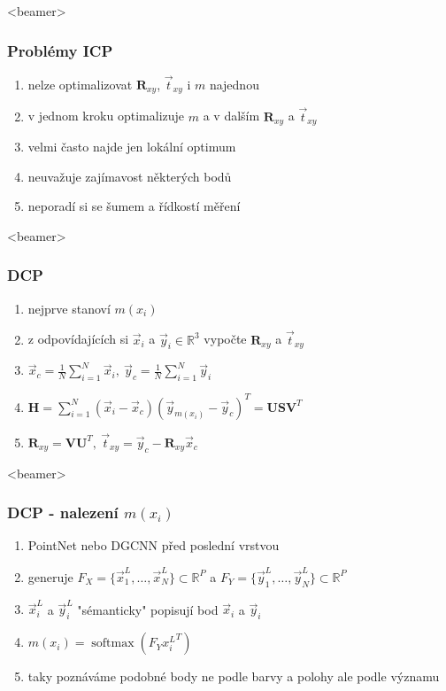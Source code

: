 \documentclass[t]{beamer}
\DeclareMathOperator*{\softmax}{softmax}
\begin{document}
\begin{frame}<beamer>
  \frametitle{Problémy ICP}
  \begin{enumerate}
   \item nelze optimalizovat  $\textbf{R}_{xy}$, $\vec{t}_{xy}$ i $m$ najednou
   \item v jednom kroku optimalizuje $m$ a v dalším  $\textbf{R}_{xy}$ a $\vec{t}_{xy}$
   \item velmi často najde jen lokální optimum
   \item neuvažuje zajímavost některých bodů 
   \item neporadí si se šumem a řídkostí měření 
  \end{enumerate}  
\end{frame}



\begin{frame}<beamer>
  \frametitle{DCP}
  \begin{enumerate}
   \item nejprve stanoví $m(x_i)$ 
   \item z odpovídajících si $\vec x_i$ a $\vec y_i \in \mathbb{R}^3$ vypočte $\textbf{R}_{xy}$ a $\vec{t}_{xy}$
   \item $\displaystyle \vec x_c = \frac{1}{N}\sum_{i=1}^N\vec x_i,~\vec y_c = \frac{1}{N}\sum_{i=1}^N\vec y_i$
   \item $\displaystyle \textbf{H} = \sum_{i=1}^N (\vec x_i-\vec x_c)(\vec y_{m(x_i)}-\vec y_c)^T = \textbf{USV}^T$
   \item $\displaystyle \textbf{R}_{xy}=\textbf{VU}^T, ~ \vec{t}_{xy}=\vec y_c - \textbf{R}_{xy}\vec x_c$
  \end{enumerate}  
\end{frame}


\begin{frame}<beamer>
  \frametitle{DCP - nalezení $m(x_i)$}
  \begin{enumerate}
   \item PointNet nebo DGCNN před poslední vrstvou 
   \item generuje $\textit{F}_X=\lbrace \vec x_1^L, \ldots, \vec x_N^L  \rbrace \subset \mathbb{R}^P $ a $\textit{F}_Y=\lbrace \vec y_1^L, \ldots, \vec y_N^L  \rbrace \subset \mathbb{R}^P$
   \item $\vec x_i^L$ a $\vec y_i^L$ "sémanticky" popisují bod $\vec x_i$ a $\vec y_i$
   \item $\displaystyle m(x_i)=\softmax(\textit{F}_Y {x_i^L}^T)$
   \item taky poznáváme podobné body ne podle barvy a polohy ale podle významu
  \end{enumerate}  
\end{frame}
\end{document}
